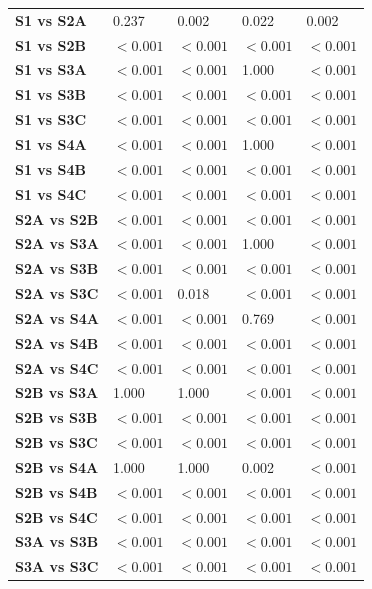 \begin{table}[H]
{\begin{tabular}{lllll}
        \textbf{S1 vs S2A} & 0.237 & 0.002 & 0.022 & 0.002 \\
        \textbf{S1 vs S2B} & $< 0.001$ & $< 0.001$ & $< 0.001$ & $< 0.001$ \\
        \textbf{S1 vs S3A} & $< 0.001$ & $< 0.001$ & 1.000 & $< 0.001$ \\
        \textbf{S1 vs S3B} & $< 0.001$ & $< 0.001$ & $< 0.001$ & $< 0.001$ \\
        \textbf{S1 vs S3C} & $< 0.001$ & $< 0.001$ & $< 0.001$ & $< 0.001$ \\
        \textbf{S1 vs S4A} & $< 0.001$ & $< 0.001$ & 1.000 & $< 0.001$ \\
        \textbf{S1 vs S4B} & $< 0.001$ & $< 0.001$ & $< 0.001$ & $< 0.001$ \\
        \textbf{S1 vs S4C} & $< 0.001$ & $< 0.001$ & $< 0.001$ & $< 0.001$ \\
        \textbf{S2A vs S2B} & $< 0.001$ & $< 0.001$ & $< 0.001$ & $< 0.001$ \\
        \textbf{S2A vs S3A} & $< 0.001$ & $< 0.001$ & 1.000 & $< 0.001$ \\
        \textbf{S2A vs S3B} & $< 0.001$ & $< 0.001$ & $< 0.001$ & $< 0.001$ \\
        \textbf{S2A vs S3C} & $< 0.001$ & 0.018 & $< 0.001$ & $< 0.001$ \\
        \textbf{S2A vs S4A} & $< 0.001$ & $< 0.001$ & 0.769 & $< 0.001$ \\
        \textbf{S2A vs S4B} & $< 0.001$ & $< 0.001$ & $< 0.001$ & $< 0.001$ \\
        \textbf{S2A vs S4C} & $< 0.001$ & $< 0.001$ & $< 0.001$ & $< 0.001$ \\
        \textbf{S2B vs S3A} & 1.000 & 1.000 & $< 0.001$ & $< 0.001$ \\
        \textbf{S2B vs S3B} & $< 0.001$ & $< 0.001$ & $< 0.001$ & $< 0.001$ \\
        \textbf{S2B vs S3C} & $< 0.001$ & $< 0.001$ & $< 0.001$ & $< 0.001$ \\
        \textbf{S2B vs S4A} & 1.000 & 1.000 & 0.002 & $< 0.001$ \\
        \textbf{S2B vs S4B} & $< 0.001$ & $< 0.001$ & $< 0.001$ & $< 0.001$ \\
        \textbf{S2B vs S4C} & $< 0.001$ & $< 0.001$ & $< 0.001$ & $< 0.001$ \\
        \textbf{S3A vs S3B} & $< 0.001$ & $< 0.001$ & $< 0.001$ & $< 0.001$ \\
        \textbf{S3A vs S3C} & $< 0.001$ & $< 0.001$ & $< 0.001$ & $< 0.001$ \\

\end{tabular}}
\end{table}
